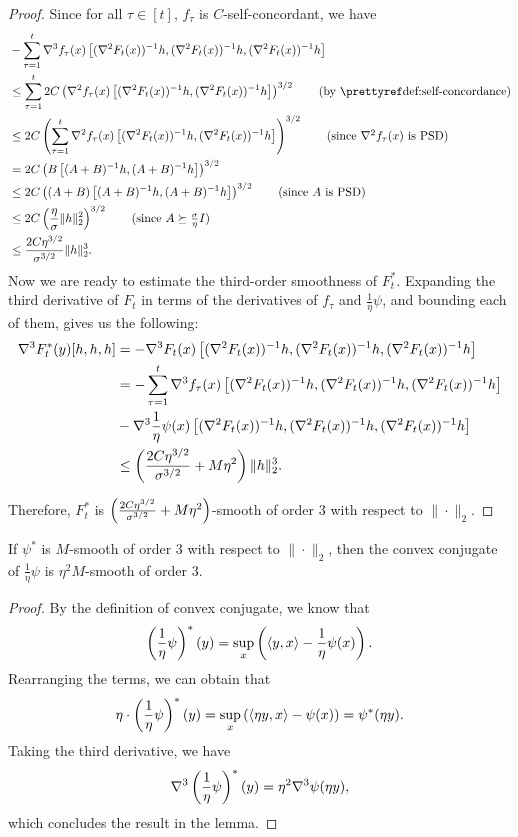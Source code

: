 \begin{proof}
    Since for all $\tau\in[t]$, $f_\tau$ is $C$-self-concordant, we have
    \begin{align*}
        &-\sum_{\tau=1}^t\nabla^3 f_\tau(x)\sbr{(\nabla^2 F_t(x))^{-1} h, (\nabla^2 F_t(x))^{-1} h, (\nabla^2 F_t(x))^{-1} h} \\
        &\le \sum_{\tau=1}^t2C\rbr{\nabla^2 f_\tau(x)\sbr{(\nabla^2 F_t(x))^{-1} h, (\nabla^2 F_t(x))^{-1} h}}^{3/2}\tag{by \pref{def:self-concordance}}\\
        &\le 2C\rbr{\sum_{\tau=1}^t\nabla^2f_\tau(x)\sbr{(\nabla^2 F_t(x))^{-1} h, (\nabla^2 F_t(x))^{-1} h}}^{3/2} \tag{since $\nabla^2f_\tau(x)$ is PSD}\\
        &= 2C\rbr{B\sbr{(A+B)^{-1}h,(A+B)^{-1}h}}^{3/2}\\
        &\le 2C\rbr{(A+B)\sbr{(A+B)^{-1}h,(A+B)^{-1}h}}^{3/2} \tag{since $A$ is PSD}\\
        &\le 2C\rbr{\frac{\eta}{\sigma}\norm{h}_2^2}^{3/2}\tag{since $A\succeq \frac{\sigma}{\eta} I$}\\
        &\le \frac{2C\eta^{3/2}}{\sigma^{3/2}} \norm{h}_2^3.
    \end{align*}
    Now we are ready to estimate the third-order smoothness of $F_t^*$. Expanding the third derivative of $F_t$ in terms of the derivatives of $f_\tau$ and $\frac{1}{\eta}\psi$, and bounding each of them, gives us the following:
    \begin{align*}
        \nabla^3 F_t^*(y)[h, h, h] &= - \nabla^3 F_t(x) \left[ (\nabla^2 F_t(x))^{-1} h, (\nabla^2 F_t(x))^{-1} h, (\nabla^2 F_t(x))^{-1} h \right]\\
        &= -\sum_{\tau=1}^t\nabla^3 f_\tau(x)\left[(\nabla^2 F_t(x))^{-1} h, (\nabla^2 F_t(x))^{-1} h, (\nabla^2 F_t(x))^{-1} h\right] \\&- \nabla^3\frac{1}{\eta}\psi(x)\left[(\nabla^2 F_t(x))^{-1} h, (\nabla^2 F_t(x))^{-1} h, (\nabla^2 F_t(x))^{-1} h\right]\\
        &\le \left(\frac{2C\eta^{3/2}}{\sigma^{3/2}}+M\eta^2\right)\lVert h\rVert_2^3.
    \end{align*}
    
    Therefore, $F_t^*$ is $\left(\frac{2C\eta^{3/2}}{\sigma^{3/2}}+M\eta^2\right)$-smooth of order $3$ with respect to $\|\cdot\|_2$.
\end{proof}

\begin{lemma}\label{lem:psi-by-eta-smoothness}
   If $\psi^*$ is $M$-smooth of order $3$ with respect to $\|\cdot\|_2$, then the convex conjugate of $\frac{1}{\eta}\psi$ is $\eta^2M$-smooth of order $3$.
\end{lemma}
\begin{proof}
    By the definition of convex conjugate, we know that
    \[
    \left(\frac{1}{\eta}\psi\right)^*(y)=\sup_x \left(\langle y,x\rangle -\frac{1}{\eta}\psi(x)\right).
    \]
    Rearranging the terms, we can obtain that
    \[
    \eta\cdot\left(\frac{1}{\eta}\psi\right)^*(y)=\sup_x \left(\langle \eta y,x\rangle -\psi(x)\right)=\psi^*(\eta y).
    \]
    Taking the third derivative, we have
    \[
     \nabla^3\left(\frac{1}{\eta}\psi\right)^*(y)=\eta^2\nabla^3\psi(\eta y),
    \]
    which concludes the result in the lemma.
\end{proof}

